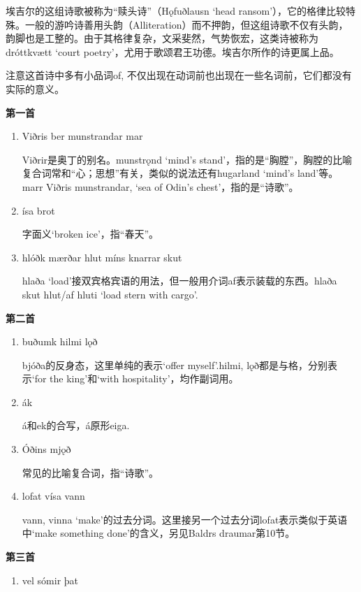 \begin{grammar*}{}
    埃吉尔的这组诗歌被称为“赎头诗”（Hǫfuðlausn `head ransom'），它的格律比较特殊。一般的游吟诗善用头韵（Alliteration）而不押韵，但这组诗歌不仅有头韵，韵脚也是工整的。由于其格律复杂，文采斐然，气势恢宏，这类诗被称为 dróttkvætt `court poetry'，尤用于歌颂君王功德。埃吉尔所作的诗更属上品。

    注意这首诗中多有小品词of, 不仅出现在动词前也出现在一些名词前，它们都没有实际的意义。

    \textbf{第一首}
    \begin{enumerate}[leftmargin=*]
        \item Viðris ber munstrandar mar

              Viðrir是奥丁的别名。munstrǫnd `mind's stand'，指的是“胸膛”，胸膛的比喻复合词常和“心；思想”有关，类似的说法还有hugarland `mind's land'等。marr Viðris munstrandar, `sea of Odin's chest'，指的是“诗歌”。

        \item ísa brot

              字面义`broken ice'，指“春天”。

        \item hlóðk mærðar hlut míns knarrar skut

              hlaða `load'接双宾格宾语的用法，但一般用介词af表示装载的东西。hlaða skut hlut/af hluti `load stern with cargo'.

    \end{enumerate}
    \textbf{第二首}
    \begin{enumerate}[leftmargin=*]
        \item buðumk hilmi lǫð

              bjóða的反身态，这里单纯的表示`offer myself'.hilmi, lǫð都是与格，分别表示`for the king'和`with hospitality'，均作副词用。

        \item ák

              á和ek的合写，á原形eiga.

        \item Óðins mjǫð

              常见的比喻复合词，指“诗歌”。

        \item lofat vísa vann

              vann, vinna `make'的过去分词。这里接另一个过去分词lofat表示类似于英语中`make something done'的含义，另见Baldrs draumar第10节。
    \end{enumerate}
    \textbf{第三首}
    \begin{enumerate}[leftmargin=*]
        \item vel sómir þat


\end{enumerate}
\end{grammar*}
